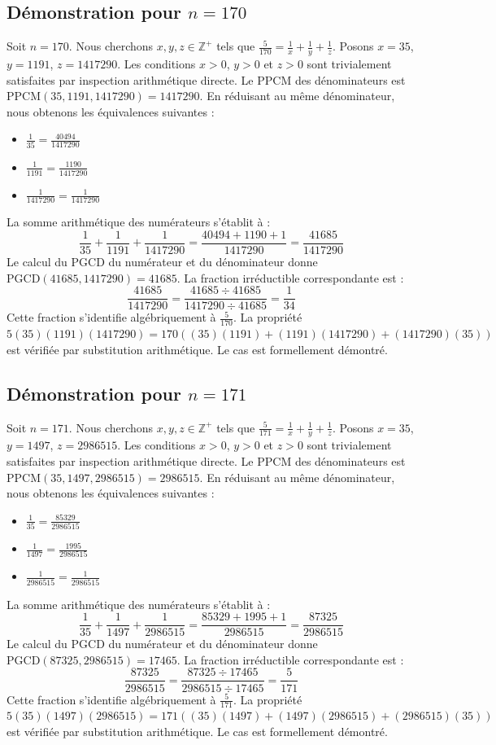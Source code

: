 \documentclass[12pt,a4paper]{article}
\begin{document}
\subsection{Démonstration pour $n = 170$}
Soit $n = 170$. Nous cherchons $x, y, z \in \mathbb{Z}^{+}$ tels que $\frac{5}{170} = \frac{1}{x} + \frac{1}{y} + \frac{1}{z}$.
Posons $x = 35$, $y = 1191$, $z = 1417290$.
Les conditions $x > 0$, $y > 0$ et $z > 0$ sont trivialement satisfaites par inspection arithmétique directe.
Le PPCM des dénominateurs est $\text{PPCM}(35, 1191, 1417290) = 1417290$.
En réduisant au même dénominateur, nous obtenons les équivalences suivantes :
\begin{itemize}
    \item $\frac{1}{35} = \frac{40494}{1417290}$
    \item $\frac{1}{1191} = \frac{1190}{1417290}$
    \item $\frac{1}{1417290} = \frac{1}{1417290}$
\end{itemize}
La somme arithmétique des numérateurs s'établit à :
$$ \frac{1}{35} + \frac{1}{1191} + \frac{1}{1417290} = \frac{40494 + 1190 + 1}{1417290} = \frac{41685}{1417290} $$
Le calcul du PGCD du numérateur et du dénominateur donne $\text{PGCD}(41685, 1417290) = 41685$.
La fraction irréductible correspondante est :
$$ \frac{41685}{1417290} = \frac{41685 \div 41685}{1417290 \div 41685} = \frac{1}{34} $$
Cette fraction s'identifie algébriquement à $\frac{5}{170}$.
La propriété $5(35)(1191)(1417290) = 170((35)(1191) + (1191)(1417290) + (1417290)(35))$ est vérifiée par substitution arithmétique.
Le cas est formellement démontré.

\subsection{Démonstration pour $n = 171$}
Soit $n = 171$. Nous cherchons $x, y, z \in \mathbb{Z}^{+}$ tels que $\frac{5}{171} = \frac{1}{x} + \frac{1}{y} + \frac{1}{z}$.
Posons $x = 35$, $y = 1497$, $z = 2986515$.
Les conditions $x > 0$, $y > 0$ et $z > 0$ sont trivialement satisfaites par inspection arithmétique directe.
Le PPCM des dénominateurs est $\text{PPCM}(35, 1497, 2986515) = 2986515$.
En réduisant au même dénominateur, nous obtenons les équivalences suivantes :
\begin{itemize}
    \item $\frac{1}{35} = \frac{85329}{2986515}$
    \item $\frac{1}{1497} = \frac{1995}{2986515}$
    \item $\frac{1}{2986515} = \frac{1}{2986515}$
\end{itemize}
La somme arithmétique des numérateurs s'établit à :
$$ \frac{1}{35} + \frac{1}{1497} + \frac{1}{2986515} = \frac{85329 + 1995 + 1}{2986515} = \frac{87325}{2986515} $$
Le calcul du PGCD du numérateur et du dénominateur donne $\text{PGCD}(87325, 2986515) = 17465$.
La fraction irréductible correspondante est :
$$ \frac{87325}{2986515} = \frac{87325 \div 17465}{2986515 \div 17465} = \frac{5}{171} $$
Cette fraction s'identifie algébriquement à $\frac{5}{171}$.
La propriété $5(35)(1497)(2986515) = 171((35)(1497) + (1497)(2986515) + (2986515)(35))$ est vérifiée par substitution arithmétique.
Le cas est formellement démontré.
\end{document}
